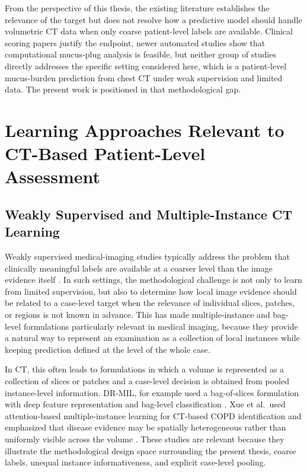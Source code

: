 From the perspective of this thesis, the existing literature establishes the relevance of the target but does not resolve how a predictive model should handle volumetric CT data when only coarse patient-level labels are available. Clinical scoring papers justify the endpoint, newer automated studies show that computational mucus-plug analysis is feasible, but neither group of studies directly addresses the specific setting considered here, which is a patient-level mucus-burden prediction from chest CT under weak supervision and limited data. The present work is positioned in that methodological gap.



\section{Learning Approaches Relevant to CT-Based Patient-Level Assessment}


\subsection{Weakly Supervised and Multiple-Instance CT Learning}
Weakly supervised medical-imaging studies typically address the problem that clinically meaningful labels are available at a coarser level than the image evidence itself \cite{ren2023weakly}. In such settings, the methodological challenge is not only to learn from limited supervision, but also to determine how local image evidence should be related to a case-level target when the relevance of individual slices, patches, or regions is not known in advance. This has made multiple-instance and bag-level formulations particularly relevant in medical imaging, because they provide a natural way to represent an examination as a collection of local instances while keeping prediction defined at the level of the whole case.

In CT, this often leads to formulations in which a volume is represented as a collection of slices or patches and a case-level decision is obtained from pooled instance-level information. DR-MIL, for example used a bag-of-slices formulation with deep feature representation and bag-level classification \cite{qi2021drmil}. Xue et al.\ used attention-based multiple-instance learning for CT-based COPD identification and emphasized that disease evidence may be spatially heterogeneous rather than uniformly visible across the volume \cite{xue2023copdmil}. These studies are relevant because they illustrate the methodological design space surrounding the present thesis, coarse labels, unequal instance informativeness, and explicit case-level pooling.

